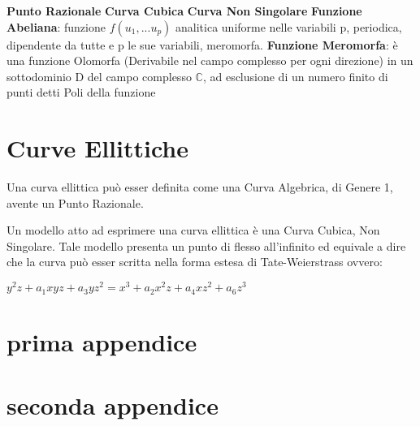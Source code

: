 \documentclass[a4paper,12pt]{tesiinfo}
\begin{document}
%
%
%
\textbf{Punto Razionale}
\newline\newline
%
%
%
\textbf{Curva Cubica}
\newline\newline
%
%
%
\textbf{Curva Non Singolare}
\newline\newline
%
%
%
\textbf{Funzione Abeliana}: funzione $f(u_1, ... u_p)$ analitica uniforme nelle variabili p, periodica, dipendente da tutte e p le sue variabili, meromorfa.
\newline\newline
%
%
%
\textbf{Funzione Meromorfa}: \`e una funzione Olomorfa (Derivabile nel campo complesso per ogni direzione) in un sottodominio D del campo complesso $\mathbb{C}$, ad esclusione di un numero finito di punti detti Poli della funzione\newline\newline
%
%
%
%
%
%
%
%
%
%
\chapter{Curve Ellittiche}

Una curva ellittica pu\`o esser definita come una Curva Algebrica, di Genere 1, avente un Punto Razionale.

Un modello atto ad esprimere una curva ellittica \`e una Curva Cubica, Non Singolare. Tale modello presenta un punto di flesso all'infinito ed equivale a dire che la curva pu\`o esser scritta nella forma estesa di Tate-Weierstrass ovvero:

$y^{2}z + a_1xyz + a_3yz^2 =x^3 + a_2x^2z + a_4xz^2 + a_6z^3$
%
%
%
%
%
%
%
%
%
%
%
%
%
%
%
%
%
%
%
%
\appendice
\chapter{prima appendice}
%
%
%
%
%
%
%
%
%
%
\chapter{seconda appendice}
%
%
%
%
%
%
%
%
%
%
\end{document}
